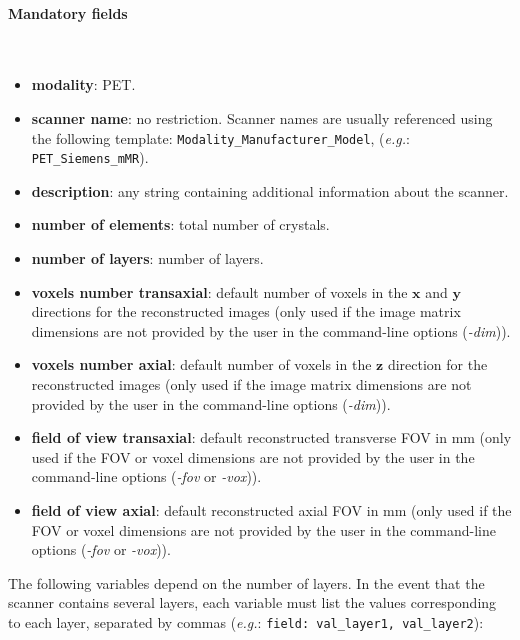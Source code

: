 \documentclass[a4paper, 11pt]{article}
\begin{document}
\paragraph{Mandatory fields}  \
\\
\begin{itemize}
  \item \textbf{modality}: PET.
  \item \textbf{scanner name}: no restriction. Scanner names are usually referenced using the following template: 
        \texttt{Modality\_Manufacturer\_Model}, ({\it e.g.}: \texttt{PET\_Siemens\_mMR}).
  \item \textbf{description}: any string containing additional information about the scanner.
  \item \textbf{number of elements}: total number of crystals.
  \item \textbf{number of layers}: number of layers.
  \item \textbf{voxels number transaxial}: default number of voxels in the ${\mathbf x}$ and ${\mathbf y}$ directions for the reconstructed images
        (only used if the image matrix dimensions are not provided by the user in the command-line options (\textit{-dim})).
  \item \textbf{voxels number axial}: default number of voxels in the ${\mathbf z}$ direction for the reconstructed images (only used if the image
        matrix dimensions are not provided by the user in the command-line options (\textit{-dim})).
  \item \textbf{field of view transaxial}: default reconstructed transverse FOV in mm (only used if the FOV or voxel dimensions are not provided by
        the user in the command-line options (\textit{-fov} or \textit{-vox})).
  \item \textbf{field of view axial}: default reconstructed axial FOV in mm (only used if the FOV or voxel dimensions are not provided by the user
        in the command-line options (\textit{-fov} or \textit{-vox})).
\end{itemize}
 
The following variables depend on the number of  layers. 
In the event that the scanner contains several layers, each variable must list the values corresponding to each layer, separated by commas ({\it e.g.}:
\texttt{field: val\_layer1, val\_layer2}):
\end{document}
